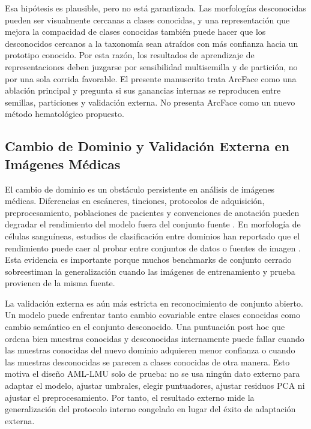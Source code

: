 \documentclass[11pt]{article}
\begin{document}
Esa hipótesis es plausible, pero no está garantizada. Las morfologías desconocidas pueden ser visualmente cercanas a clases conocidas, y una representación que mejora la compacidad de clases conocidas también puede hacer que los desconocidos cercanos a la taxonomía sean atraídos con más confianza hacia un prototipo conocido. Por esta razón, los resultados de aprendizaje de representaciones deben juzgarse por sensibilidad multisemilla y de partición, no por una sola corrida favorable. El presente manuscrito trata ArcFace como una ablación principal y pregunta si sus ganancias internas se reproducen entre semillas, particiones y validación externa. No presenta ArcFace como un nuevo método hematológico propuesto.

\subsection{Cambio de Dominio y Validación Externa en Imágenes Médicas}

El cambio de dominio es un obstáculo persistente en análisis de imágenes médicas. Diferencias en escáneres, tinciones, protocolos de adquisición, preprocesamiento, poblaciones de pacientes y convenciones de anotación pueden degradar el rendimiento del modelo fuera del conjunto fuente \cite{litjens2017_medical_ai_survey,guan2022_domain_adaptation_medical}. En morfología de células sanguíneas, estudios de clasificación entre dominios han reportado que el rendimiento puede caer al probar entre conjuntos de datos o fuentes de imagen \cite{salehi2022_cross_domain,sadafi2024_continual_wbc,tsutsui2023_wbc_domain_shift}. Esta evidencia es importante porque muchos benchmarks de conjunto cerrado sobreestiman la generalización cuando las imágenes de entrenamiento y prueba provienen de la misma fuente.

La validación externa es aún más estricta en reconocimiento de conjunto abierto. Un modelo puede enfrentar tanto cambio covariable entre clases conocidas como cambio semántico en el conjunto desconocido. Una puntuación post hoc que ordena bien muestras conocidas y desconocidas internamente puede fallar cuando las muestras conocidas del nuevo dominio adquieren menor confianza o cuando las muestras desconocidas se parecen a clases conocidas de otra manera. Esto motiva el diseño AML-LMU solo de prueba: no se usa ningún dato externo para adaptar el modelo, ajustar umbrales, elegir puntuadores, ajustar residuos PCA ni ajustar el preprocesamiento. Por tanto, el resultado externo mide la generalización del protocolo interno congelado en lugar del éxito de adaptación externa.
\end{document}
